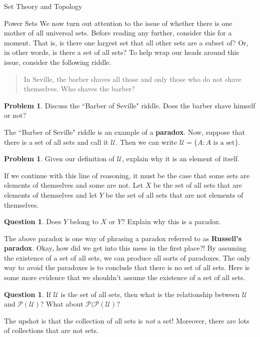 \documentclass[11pt]{article}
\theoremstyle{definition}
\newtheorem{problem}[theorem]{Problem}
\newtheorem{question}[theorem]{Question}
\begin{document}
\begin{section}{Set Theory and Topology}
\begin{subsection}{Power Sets}
We now turn out attention to the issue of whether there is one mother of all universal sets.  Before reading any further, consider this for a moment.  That is, is there one largest set that all other sets are a subset of?  Or, in other words, is there a set of all sets?  To help wrap our heads around this issue, consider the following riddle.

\begin{quote}
In Seville, the barber shaves all those and only those who do not shave themselves.  Who shaves the barber?
\end{quote}

\begin{problem}
Discuss the ``Barber of Seville" riddle.  Does the barber shave himself or not?
\end{problem}

The ``Barber of Seville" riddle is an example of a \textbf{paradox}.  Now, suppose that there is a set of all sets and call it $\mathcal{U}$.  Then we can write $\mathcal{U}=\{A:A\mbox{ is a set}\}$.

\begin{problem}
Given our definition of $\mathcal{U}$, explain why it is an element of itself.
\end{problem}

If we continue with this line of reasoning, it must be the case that some sets are elements of themselves and some are not.  Let $X$ be the set of all sets that are elements of themselves and let $Y$ be the set of all sets that are not elements of themselves.

\begin{question}
Does $Y$ belong to $X$ or $Y$?  Explain why this is a paradox.
\end{question}

The above paradox is one way of phrasing a paradox referred to as \textbf{Russell's paradox}.  Okay, how did we get into this mess in the first place?!  By assuming the existence of a set of all sets, we can produce all sorts of paradoxes.  The only way to avoid the paradoxes is to conclude that there is no set of all sets.  Here is some more evidence that we shouldn't assume the existence of a set of all sets.

\begin{question}
If $\mathcal{U}$ is the set of all sets, then what is the relationship between $\mathcal{U}$ and $\mathcal{P}(\mathcal{U})$?  What about $\mathcal{P}(\mathcal{P}(\mathcal{U})$?
\end{question}

The upshot is that the collection of all sets is \emph{not} a set!  Moreover, there are lots of collections that are not sets.

\end{subsection}

\end{section}
\end{document}

